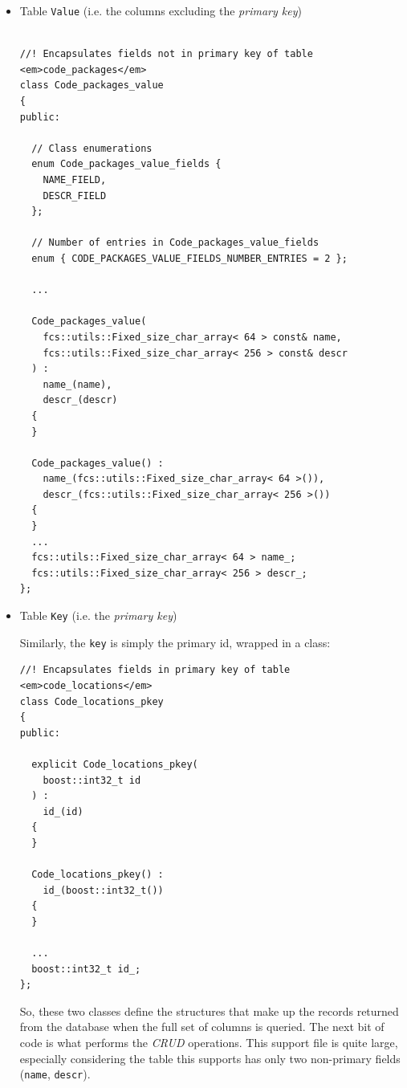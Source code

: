 \documentclass[11pt]{article}
\begin{document}
\pagebreak
\begin{itemize}

\item Table \texttt{Value} (i.e. the columns excluding the \emph{primary key})\\
\label{sec-4.2.1.1}



\lstset{language=C++}
\begin{lstlisting}

//! Encapsulates fields not in primary key of table <em>code_packages</em>
class Code_packages_value 
{
public:

  // Class enumerations
  enum Code_packages_value_fields {
    NAME_FIELD,
    DESCR_FIELD
  };

  // Number of entries in Code_packages_value_fields
  enum { CODE_PACKAGES_VALUE_FIELDS_NUMBER_ENTRIES = 2 };

  ...

  Code_packages_value(
    fcs::utils::Fixed_size_char_array< 64 > const& name,
    fcs::utils::Fixed_size_char_array< 256 > const& descr
  ) :
    name_(name),
    descr_(descr)
  {
  }

  Code_packages_value() :
    name_(fcs::utils::Fixed_size_char_array< 64 >()),
    descr_(fcs::utils::Fixed_size_char_array< 256 >()) 
  {
  }
  ...
  fcs::utils::Fixed_size_char_array< 64 > name_;
  fcs::utils::Fixed_size_char_array< 256 > descr_;
};
\end{lstlisting}



\pagebreak

\item Table \texttt{Key} (i.e. the \emph{primary key})\\
\label{sec-4.2.1.2}

  Similarly, the \texttt{key} is simply the primary id, wrapped in a class:


\lstset{language=C++}
\begin{lstlisting}
//! Encapsulates fields in primary key of table <em>code_locations</em>
class Code_locations_pkey 
{
public:

  explicit Code_locations_pkey(
    boost::int32_t id
  ) :
    id_(id)
  {
  }

  Code_locations_pkey() :
    id_(boost::int32_t()) 
  {
  }

  ...
  boost::int32_t id_;
};
\end{lstlisting}



\pagebreak
  So, these two classes define the structures that make up the records
  returned from the database when the full set of columns is
  queried. The next bit of code is what performs the \emph{CRUD}
  operations. This support file is quite large, especially considering
  the table this supports has only two non-primary fields (\texttt{name},
  \texttt{descr}).



\end{itemize}
\end{document}
